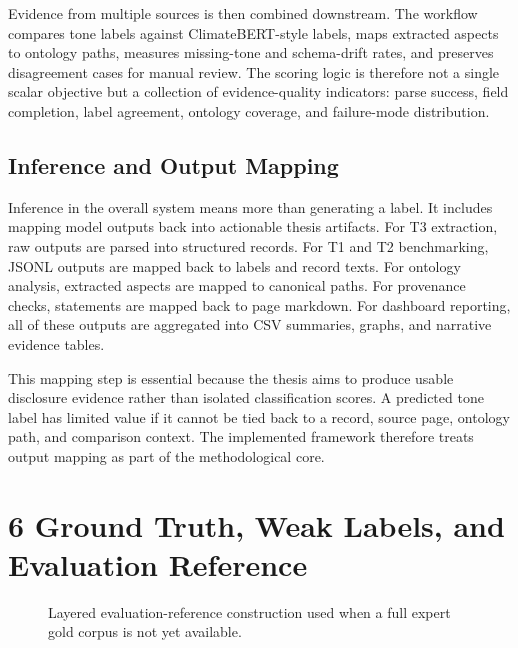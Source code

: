 Evidence from multiple sources is then combined downstream. The workflow compares tone labels against ClimateBERT-style labels, maps extracted aspects to ontology paths, measures missing-tone and schema-drift rates, and preserves disagreement cases for manual review. The scoring logic is therefore not a single scalar objective but a collection of evidence-quality indicators: parse success, field completion, label agreement, ontology coverage, and failure-mode distribution.

\subsection{Inference and Output Mapping}

Inference in the overall system means more than generating a label. It includes mapping model outputs back into actionable thesis artifacts. For T3 extraction, raw outputs are parsed into structured records. For T1 and T2 benchmarking, JSONL outputs are mapped back to labels and record texts. For ontology analysis, extracted aspects are mapped to canonical paths. For provenance checks, statements are mapped back to page markdown. For dashboard reporting, all of these outputs are aggregated into CSV summaries, graphs, and narrative evidence tables.

This mapping step is essential because the thesis aims to produce usable disclosure evidence rather than isolated classification scores. A predicted tone label has limited value if it cannot be tied back to a record, source page, ontology path, and comparison context. The implemented framework therefore treats output mapping as part of the methodological core.

\section{6 Ground Truth, Weak Labels, and Evaluation Reference}

\begin{figure}[ht]
\begin{center}
\end{center}
\caption{Layered evaluation-reference construction used when a full expert gold corpus is not yet available.}
\label{fig:implementation-ground-truth}
\end{figure}

